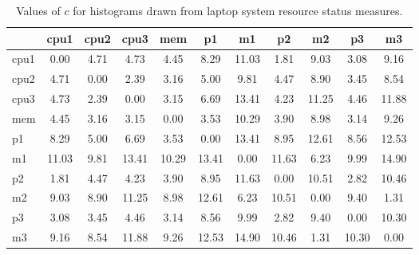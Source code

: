 \begin{table}[h!]
\begin{center}
\begin{tabular}{| l | c | c | c | c | c | c | c | c | c | c |}\hline
 & cpu1 & cpu2 & cpu3 & mem & p1 & m1 & p2 & m2 & p3 & m3 \\\hline
cpu1 & 0.00  & 4.71  & 4.73  & 4.45  & 8.29  & 11.03  & 1.81  & 9.03  & 3.08  & 9.16 \\\hline
cpu2 & 4.71  & 0.00  & 2.39  & 3.16  & 5.00  & 9.81  & 4.47  & 8.90  & 3.45  & 8.54 \\\hline
cpu3 & 4.73  & 2.39  & 0.00  & 3.15  & 6.69  & 13.41  & 4.23  & 11.25  & 4.46  & 11.88 \\\hline
mem & 4.45  & 3.16  & 3.15  & 0.00  & 3.53  & 10.29  & 3.90  & 8.98  & 3.14  & 9.26 \\\hline
p1 & 8.29  & 5.00  & 6.69  & 3.53  & 0.00  & 13.41  & 8.95  & 12.61  & 8.56  & 12.53 \\\hline
m1 & 11.03  & 9.81  & 13.41  & 10.29  & 13.41  & 0.00  & 11.63  & 6.23  & 9.99  & 14.90 \\\hline
p2 & 1.81  & 4.47  & 4.23  & 3.90  & 8.95  & 11.63  & 0.00  & 10.51  & 2.82  & 10.46 \\\hline
m2 & 9.03  & 8.90  & 11.25  & 8.98  & 12.61  & 6.23  & 10.51  & 0.00  & 9.40  & 1.31 \\\hline
p3 & 3.08  & 3.45  & 4.46  & 3.14  & 8.56  & 9.99  & 2.82  & 9.40  & 0.00  & 10.30 \\\hline
m3 & 9.16  & 8.54  & 11.88  & 9.26  & 12.53  & 14.90  & 10.46  & 1.31  & 10.30  & 0.00 \\\hline
\end{tabular}
\caption{Values of $c$ for histograms drawn from laptop system resource status measures.}
\end{center}
\end{table}